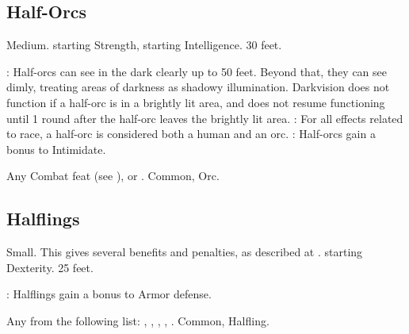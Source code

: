 \subsection{Half-Orcs}
 Medium.
  starting Strength,  starting Intelligence.
 30 feet.
\begin{itemize}
    : Half-orcs can see in the dark clearly up to 50 feet.   Beyond that, they can see dimly, treating areas of darkness as shadowy illumination. Darkvision does not function if a half-orc is in a brightly lit area, and does not resume functioning until 1 round after the half-orc leaves the brightly lit area.
    : For all effects related to race, a half-orc is considered both a human and an orc.
    : Half-orcs gain a  bonus to Intimidate.
\end{itemize}
 Any Combat feat (see ), or .
 Common, Orc.

\subsection{Halflings}
 Small. This gives several benefits and penalties, as described at .
  starting Dexterity.
 25 feet.
\begin{itemize}
    : Halflings gain a  bonus to Armor defense.
\end{itemize}
 Any from the following list: , , , , .
 Common, Halfling.
